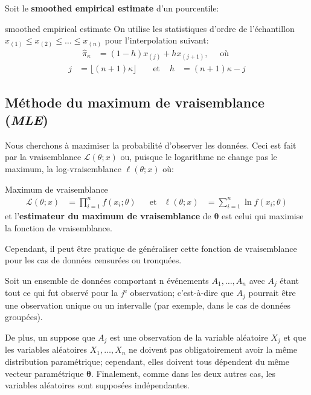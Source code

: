 \documentclass[10pt, french]{article}
\begin{document}
\begin{multicols*}{3}
Soit le \guillemotleft \textbf{smoothed empirical estimate} \guillemotright d'un pourcentile:

\begin{algo}{\guillemotleft smoothed empirical estimate \guillemotright}
On utilise les statistiques d'ordre de l'échantillon $x_{(1)} \le x_{(2)} \le \dots \le x_{(n)}$ pour l'interpolation suivant:
\begin{align*}
	\hat\pi_{\kappa}
	&=	(1 - h)x_{(j)} + h x_{(j + 1)}, \quad \text{ où }	
\end{align*}
\begin{align*}
	j
	&=	\lfloor (n + 1) \kappa \rfloor	&
	&\text{ et }	&
	h
	&=	(n + 1) \kappa - j
\end{align*}
\end{algo}


\subsection*{Méthode du maximum de vraisemblance (\emph{MLE})}

Nous cherchons à maximiser la probabilité d'observer les données.
Ceci est fait par la vraisemblance $\mathcal{L}(\theta; x)$ ou, puisque le logarithme ne change pas le maximum, la log-vraisemblance $\ell(\theta; x)$ où:

\begin{algo}{Maximum de vraisemblance}
\setlength{\mathindent}{-1cm}
\begin{align*}
	\mathcal{L}(\theta; x)
	&=	\prod_{i = 1}^{n}	f(x_{i}; \theta)	&
	&\text{et}	&
	\ell(\theta; x)
	&=	\sum_{i = 1}^{n} \ln	f(x_{i}; \theta)	
\end{align*}
\setlength{\mathindent}{1cm}
et l'\textbf{estimateur du maximum de vraisemblance} de $\bm\theta$ est celui qui maximise la fonction de vraisemblance.
\end{algo}
Cependant, il peut être pratique de généraliser cette fonction de vraisemblance pour les cas de données censurées ou tronquées.

Soit un ensemble de données comportant n événements $A_{1}, \dots, A_{n}$ avec $A_{j}$ étant tout ce qui fut observé pour la $j^{\text{e}}$ observation; c'est-à-dire que $A_{j}$ pourrait être une observation unique ou un intervalle (par exemple, dans le cas de données groupées).

De plus, un suppose que $A_{j}$ est une observation de la variable aléatoire $X_{j}$ et que les variables aléatoires $X_{1}, \dots, X_{n}$ ne doivent pas obligatoirement avoir la même distribution paramétrique; cependant, elles doivent tous dépendent du même vecteur paramétrique $\bm\theta$.
Finalement, comme dans les deux autres cas, les variables aléatoires sont supposées indépendantes.


\end{multicols*}
\end{document}
